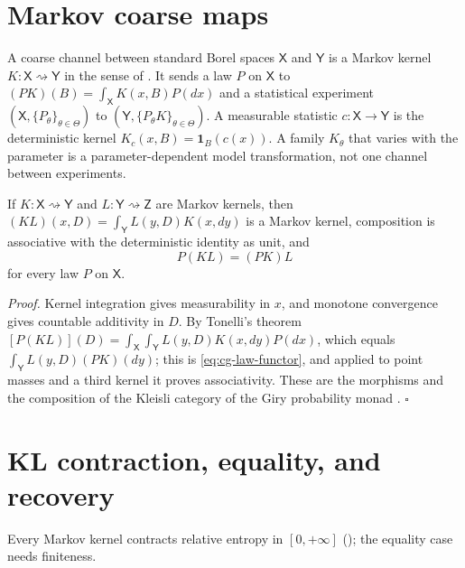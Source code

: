 \section{Markov coarse maps}
\label{sec:cg-markov-category}

\label{eq:cg-markov-pushforward}
A coarse channel between standard Borel spaces $\mathsf X$ and $\mathsf Y$ is a Markov kernel
$K:\mathsf X\rightsquigarrow\mathsf Y$ in the sense of . It sends a law
$P$ on $\mathsf X$ to $(PK)(B)=\int_{\mathsf X}K(x,B)P(dx)$ and a statistical experiment
$(\mathsf X,\{P_\theta\}_{\theta\in\Theta})$ to $(\mathsf Y,\{P_\theta K\}_{\theta\in\Theta})$. A
measurable statistic $c:\mathsf X\to\mathsf Y$ is the deterministic kernel
$K_c(x,B)=\mathbf 1_B(c(x))$. A family $K_\theta$ that varies with the parameter is a
parameter-dependent model transformation, not one channel between experiments.

\label{eq:cg-kernel-composition}
If $K:\mathsf X\rightsquigarrow\mathsf Y$ and $L:\mathsf Y\rightsquigarrow\mathsf Z$ are Markov
kernels, then $(KL)(x,D)=\int_{\mathsf Y}L(y,D)K(x,dy)$ is a Markov kernel, composition is
associative with the deterministic identity as unit, and
\begin{equation}
P(KL)=(PK)L
\label{eq:cg-law-functor}
\end{equation}
for every law $P$ on $\mathsf X$. 

\noindent\emph{Proof.}
Kernel integration gives measurability in $x$, and monotone convergence gives countable additivity
in $D$. By Tonelli's theorem $[P(KL)](D)=\int_{\mathsf X}\int_{\mathsf Y}L(y,D)K(x,dy)P(dx)$, which
equals $\int_{\mathsf Y}L(y,D)(PK)(dy)$; this is \eqref{eq:cg-law-functor}, and applied to point
masses and a third kernel it proves associativity. These are the morphisms and the composition of
the Kleisli category of the Giry probability monad \citep{Giry1982}. $\square$

\section{KL contraction, equality, and recovery}
\label{sec:cg-kl-recovery}

Every Markov kernel contracts relative entropy in $[0,+\infty]$ ();
the equality case needs finiteness.

